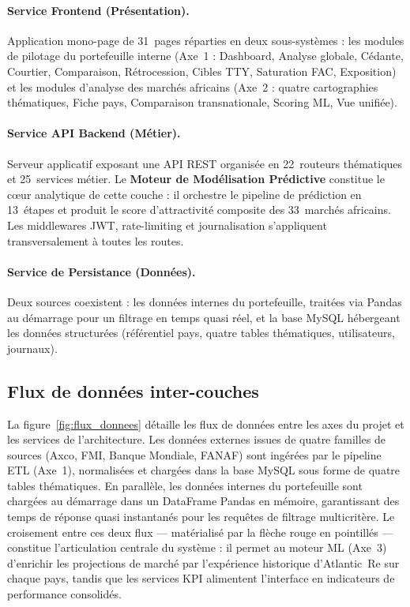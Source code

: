 \documentclass[12pt,a4paper]{report}
\begin{document}
\paragraph{Service Frontend (Présentation).} Application mono-page de 31~pages réparties en deux sous-systèmes : les modules de pilotage du portefeuille interne (Axe~1 : Dashboard, Analyse globale, Cédante, Courtier, Comparaison, Rétrocession, Cibles TTY, Saturation FAC, Exposition) et les modules d'analyse des marchés africains (Axe~2 : quatre cartographies thématiques, Fiche pays, Comparaison transnationale, Scoring ML, Vue unifiée).

\paragraph{Service API Backend (Métier).} Serveur applicatif exposant une API REST organisée en 22~routeurs thématiques et 25~services métier. Le \textbf{Moteur de Modélisation Prédictive} constitue le c\oe{}ur analytique de cette couche : il orchestre le pipeline de prédiction en 13~étapes et produit le score d'attractivité composite des 33~marchés africains. Les middlewares JWT, rate-limiting et journalisation s'appliquent transversalement à toutes les routes.

\paragraph{Service de Persistance (Données).} Deux sources coexistent : les données internes du portefeuille, traitées via Pandas au démarrage pour un filtrage en temps quasi réel, et la base MySQL hébergeant les données structurées (référentiel pays, quatre tables thématiques, utilisateurs, journaux).

\subsection{Flux de données inter-couches}

La figure~\ref{fig:flux_donnees} détaille les flux de données entre les axes du projet et les services de l'architecture. Les données externes issues de quatre familles de sources (Axco, FMI, Banque Mondiale, FANAF) sont ingérées par le pipeline ETL (Axe~1), normalisées et chargées dans la base MySQL sous forme de quatre tables thématiques. En parallèle, les données internes du portefeuille sont chargées au démarrage dans un DataFrame Pandas en mémoire, garantissant des temps de réponse quasi instantanés pour les requêtes de filtrage multicritère. Le croisement entre ces deux flux --- matérialisé par la flèche rouge en pointillés --- constitue l'articulation centrale du système : il permet au moteur ML (Axe~3) d'enrichir les projections de marché par l'expérience historique d'Atlantic~Re sur chaque pays, tandis que les services KPI alimentent l'interface en indicateurs de performance consolidés.
\end{document}
